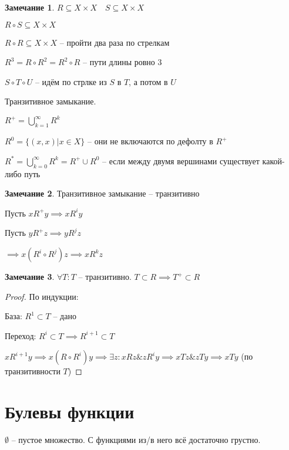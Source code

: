 \documentclass{book}
\renewcommand\O{\ensuremath{\emptyset}}
\theoremstyle{definition}
\newtheorem*{note}{Замечание}
\begin{document}
    \begin{note}
        $R\subseteq X\times X\quad S\subseteq X\times X$

        $R\circ S \subseteq X\times X$
        
        $R\circ R\subseteq X\times X$ -- пройти два раза по стрелкам

        $R^3 = R\circ R^2 = R^2\circ R$ -- пути длины ровно 3

        $S\circ T\circ U$ -- идём по стрлке из $S$ в $T$, а потом в $U$
    \end{note}

    \begin{definition}
        Транзитивное замыкание.

        $R^+ = \bigcup\limits_{k=1}^{\infty } R^k$

        $R^0 = \{(x,x)|x\in X\}$ -- они не включаются по дефолту в $R^+$

        $R^* = \bigcup\limits_{k=0} ^{\infty } R^k = R^+ \cup R^0$ -- если между двумя вершинами существует какой-либо путь
    \end{definition}
    \begin{note}
        Транзитивное замыкание -- транзитивно

        Пусть $xR^+y \implies x R^i y$

        Пусть $yR^+z \implies yR^j z$

        $\implies x(R^i\circ R^j)z \implies  xR^k z$
    \end{note}
    \begin{note}
        $\forall T:T$ -- транзитивно. $T\subset R \implies T^+ \subset R$
    \end{note}
    \begin{proof}
        По индукции:

        База: $R^1 \subset T$ -- дано

        Переход: $R^i\subset T \implies  R^{i+1}\subset T$

        $xR^{i+1}y \implies x(R\circ R^i)y\implies \exists z: xRz\&zR^iy \implies xTz\&zTy \implies xTy$ (по транзитивности $T$)
    \end{proof}

    \section{Булевы функции}

    $\O $ -- пустое множество. С функциями из/в него всё достаточно грустно.
\end{document}
